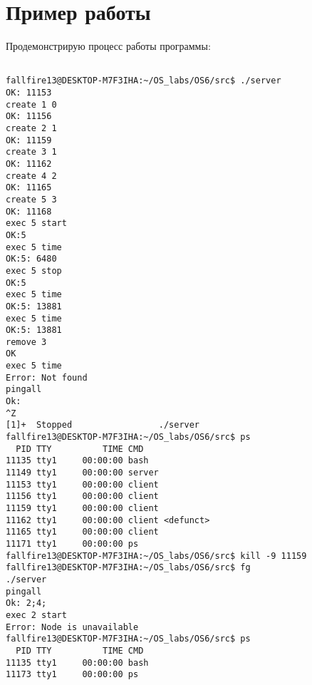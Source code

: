 \section{Пример работы}

Продемонстрирую процесс работы программы:

\begin{verbatim}

fallfire13@DESKTOP-M7F3IHA:~/OS_labs/OS6/src$ ./server
OK: 11153
create 1 0
OK: 11156
create 2 1
OK: 11159
create 3 1
OK: 11162
create 4 2
OK: 11165
create 5 3
OK: 11168
exec 5 start
OK:5
exec 5 time
OK:5: 6480
exec 5 stop
OK:5
exec 5 time
OK:5: 13881
exec 5 time
OK:5: 13881
remove 3
OK
exec 5 time
Error: Not found
pingall
Ok:
^Z
[1]+  Stopped                 ./server
fallfire13@DESKTOP-M7F3IHA:~/OS_labs/OS6/src$ ps
  PID TTY          TIME CMD
11135 tty1     00:00:00 bash
11149 tty1     00:00:00 server
11153 tty1     00:00:00 client
11156 tty1     00:00:00 client
11159 tty1     00:00:00 client
11162 tty1     00:00:00 client <defunct>
11165 tty1     00:00:00 client
11171 tty1     00:00:00 ps
fallfire13@DESKTOP-M7F3IHA:~/OS_labs/OS6/src$ kill -9 11159
fallfire13@DESKTOP-M7F3IHA:~/OS_labs/OS6/src$ fg
./server
pingall
Ok: 2;4;
exec 2 start
Error: Node is unavailable
fallfire13@DESKTOP-M7F3IHA:~/OS_labs/OS6/src$ ps
  PID TTY          TIME CMD
11135 tty1     00:00:00 bash
11173 tty1     00:00:00 ps

\end{verbatim}

\pagebreak


